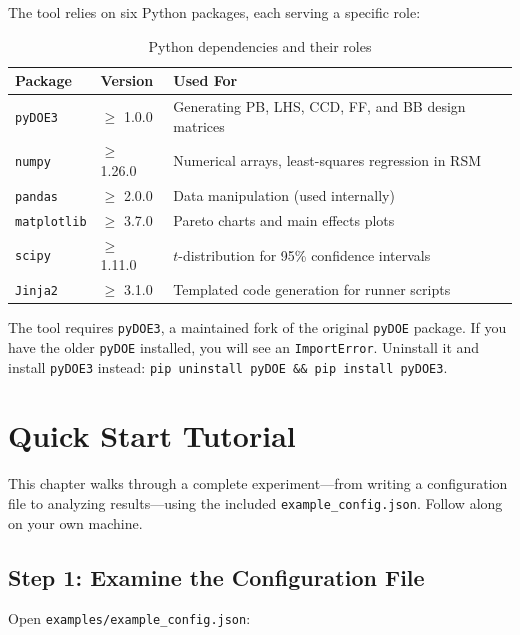 \documentclass[11pt]{book}
\begin{document}
The tool relies on six Python packages, each serving a specific role:

\begin{table}[H]
\centering
\caption{Python dependencies and their roles}
\begin{tabular}{@{}lll@{}}
\toprule
\textbf{Package} & \textbf{Version} & \textbf{Used For} \\
\midrule
\texttt{pyDOE3}     & $\geq$ 1.0.0  & Generating PB, LHS, CCD, FF, and BB design matrices \\
\texttt{numpy}       & $\geq$ 1.26.0 & Numerical arrays, least-squares regression in RSM \\
\texttt{pandas}      & $\geq$ 2.0.0  & Data manipulation (used internally) \\
\texttt{matplotlib}  & $\geq$ 3.7.0  & Pareto charts and main effects plots \\
\texttt{scipy}       & $\geq$ 1.11.0 & $t$-distribution for 95\% confidence intervals \\
\texttt{Jinja2}      & $\geq$ 3.1.0  & Templated code generation for runner scripts \\
\bottomrule
\end{tabular}
\end{table}

\begin{warning}
The tool requires \texttt{pyDOE3}, a maintained fork of the original \texttt{pyDOE} package. If you have the older \texttt{pyDOE} installed, you will see an \texttt{ImportError}. Uninstall it and install \texttt{pyDOE3} instead: \texttt{pip uninstall pyDOE \&\& pip install pyDOE3}.
\end{warning}


\chapter{Quick Start Tutorial}
\label{ch:quickstart}

This chapter walks through a complete experiment---from writing a configuration file to analyzing results---using the included \texttt{example\_config.json}. Follow along on your own machine.

\section{Step 1: Examine the Configuration File}

Open \texttt{examples/example\_config.json}:
\end{document}
